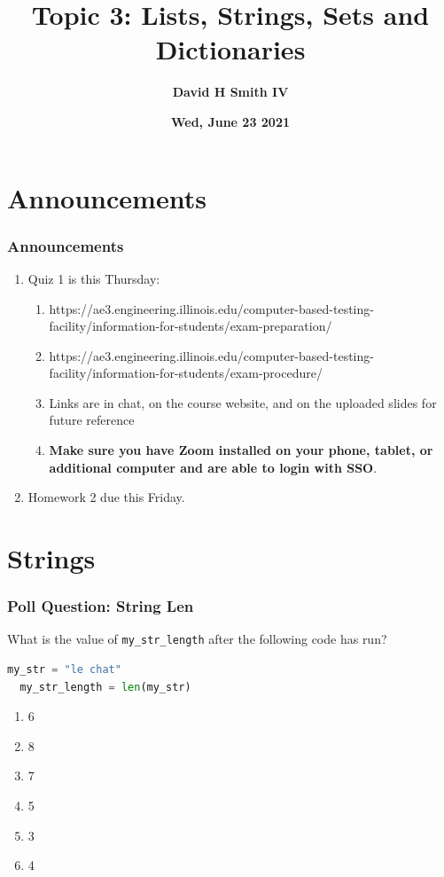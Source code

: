 \documentclass{beamer}
\title{\textbf{Topic 3: Lists, Strings, Sets and Dictionaries}}
\author{\textbf{David H Smith IV}}
\institute[\textbf{UIUC}]{\textbf{University of Illinois Urbana-Champaign}}
\date{\textbf{Wed, June 23 2021}}
\begin{document}
\frame{\titlepage}

\section{Announcements}

%
%
\begin{frame}
  \frametitle{Announcements}
  \begin{enumerate}
    \item Quiz 1 is this Thursday:
      \begin{enumerate}
        \item https://ae3.engineering.illinois.edu/computer-based-testing-facility/information-for-students/exam-preparation/
        \item https://ae3.engineering.illinois.edu/computer-based-testing-facility/information-for-students/exam-procedure/ 
        \item Links are in chat, on the course website, and on the uploaded slides for future reference
        \item \textbf{Make sure you have Zoom installed on your phone, tablet, or additional computer and are able to login with SSO}.
      \end{enumerate}
  \item Homework 2 due this Friday.
  \end{enumerate}
\end{frame}

\section{Strings}
%
%
\begin{frame}[fragile]
  \frametitle{Poll Question: String Len}
  What is the value of \lstinline|my_str_length| after the following code has run?
  \begin{lstlisting}[language=Python, autogobble] 
  my_str = "le chat"
  my_str_length = len(my_str)
  \end{lstlisting}
  \vfill
  \begin{enumerate}[A]
    \item 6
    \item 8
    \item 7 %
    \item 5
    \item 3
    \item 4
  \end{enumerate}
\end{frame}
\end{document}
